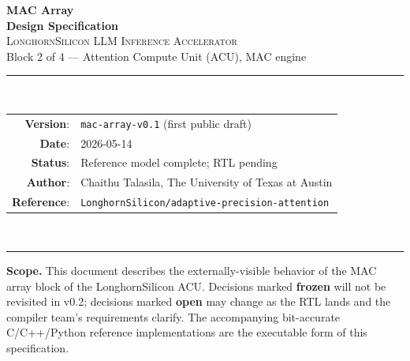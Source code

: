 \documentclass[11pt]{article}
\begin{document}
\thispagestyle{empty}
\begin{center}
\vspace*{1.2in}
{\Huge\bfseries MAC Array}\\[0.4em]
{\LARGE\bfseries Design Specification}\\[1.2em]

{\large \textsc{LonghornSilicon LLM Inference Accelerator}}\\[0.4em]
{\large Block 2 of 4 --- Attention Compute Unit (ACU), MAC engine}\\[2em]

\rule{0.7\textwidth}{0.4pt}\\[1em]

\begin{tabular}{rl}
\textbf{Version}:    & \texttt{mac-array-v0.1} (first public draft) \\
\textbf{Date}:       & 2026-05-14 \\
\textbf{Status}:     & Reference model complete; RTL pending \\
\textbf{Author}:     & Chaithu Talasila, The University of Texas at Austin \\
\textbf{Reference}:  & \texttt{LonghornSilicon/adaptive-precision-attention} \\
\end{tabular}\\[1em]
\rule{0.7\textwidth}{0.4pt}

\vfill
\begin{minipage}{0.85\textwidth}
\small
\textbf{Scope.} This document describes the externally-visible behavior of
the MAC array block of the LonghornSilicon ACU. Decisions marked
\textbf{frozen} will not be revisited in v0.2; decisions marked
\textbf{open} may change as the RTL lands and the compiler team's
requirements clarify. The accompanying bit-accurate C/C++/Python
reference implementations are the executable form of this specification.
\end{minipage}

\vspace{0.3in}
\end{center}

\clearpage

\tableofcontents
\clearpage

\end{document}
